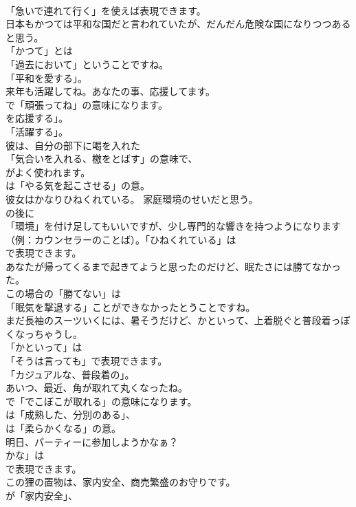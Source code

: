\documentclass[8pt]{extreport}
\begin{document}
\begin{CJK}{UTF8}{min}
\\	「急いで連れて行く」を使えば表現できます。	
\\	日本もかつては平和な国だと言われていたが、だんだん危険な国になりつつあると思う。 
\\	「かつて」とは
\\	「過去において」ということですね。
\\	「平和を愛する」。	
\\	来年も活躍してね。あなたの事、応援してます。 
\\	で「頑張ってね」の意味になります。
\\	を応援する」。
\\	「活躍する」。	
\\	彼は、自分の部下に喝を入れた 
\\	「気合いを入れる、檄をとばす」の意味で、
\\	がよく使われます。
\\	は「やる気を起こさせる」の意。	
\\	彼女はかなりひねくれている。 家庭環境のせいだと思う。 
\\	の後に
\\	「環境」を付け足してもいいですが、少し専門的な響きを持つようになります（例：カウンセラーのことば）。「ひねくれている」は
\\	で表現できます。	
\\	あなたが帰ってくるまで起きてようと思ったのだけど、眠たさには勝てなかった。 
\\	この場合の「勝てない」は
\\	「眠気を撃退する」ことができなかったとうことですね。	
\\	まだ長袖のスーツいくには、暑そうだけど、かといって、上着脱ぐと普段着っぽくなっちゃうし。 
\\	「かといって」は
\\	「そうは言っても」で表現できます。
\\	「カジュアルな、普段着の」。	
\\	あいつ、最近、角が取れて丸くなったね。 
\\	で「でこぼこが取れる」の意味になります。
\\	は「成熟した、分別のある」、
\\	は「柔らかくなる」の意。	
\\	明日、パーティーに参加しようかなぁ？ 
\\	かな」は
\\	で表現できます。	
\\	この狸の置物は、家内安全、商売繁盛のお守りです。 
\\	が「家内安全」、

\end{CJK}
\end{document}
